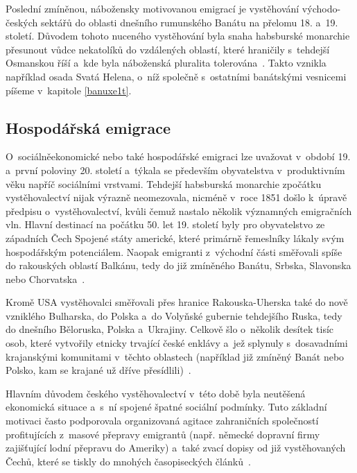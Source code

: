 Poslední zmíněnou, nábožensky motivovanou emigrací je vystěhování východo-českých sektářů do oblasti dnešního rumunského Banátu na přelomu 18. a~19. století. Důvodem tohoto nuceného vystěhování byla snaha habsburské monarchie přesunout vůdce nekatolíků do vzdálených oblastí, které hraničily s~tehdejší Osmanskou říší a~kde byla náboženská pluralita tolerována~\parencite{Nespor2005}. Takto vznikla například osada Svatá Helena, o~níž společně s~ostatními banátskými vesnicemi píšeme v~kapitole \ref{banuxe1t}.

\hypertarget{hospoduxe1ux159skuxe1-emigrace}{%
\subsection{Hospodářská emigrace}\label{hospoduxe1ux159skuxe1-emigrace}}

O~sociálněekonomické nebo také hospodářské emigraci lze uvažovat v~období 19. a~první poloviny 20. století a~týkala se především obyvatelstva v~produktivním věku napříč sociálními vrstvami. Tehdejší habsburská monarchie zpočátku vystěhovalectví nijak výrazně neomezovala, nicméně v~roce 1851 došlo k~úpravě předpisu o~vystěhovalectví, kvůli čemuž nastalo několik významných emigračních vln. Hlavní destinací na počátku 50. let 19. století byly pro obyvatelstvo ze západních Čech Spojené státy americké, které primárně řemeslníky lákaly svým hospodářským potenciálem. Naopak emigranti z~východní části směřovali spíše do rakouských oblastí Balkánu, tedy do již zmíněného Banátu, Srbska, Slavonska nebo Chorvatska~\parencite{Vaculik2009b}.

Kromě USA vystěhovalci směřovali přes hranice Rakouska-Uherska také do nově vzniklého Bulharska, do Polska a~do Volyňské gubernie tehdejšího Ruska, tedy do dnešního Běloruska, Polska a~Ukrajiny. Celkově šlo o~několik desítek tisíc osob, které vytvořily etnicky trvající české enklávy a~jež splynuly s~dosavadními krajanskými komunitami v~těchto oblastech (například již zmíněný Banát nebo Polsko, kam se krajané už dříve přesídlili)~\parencite{Nespor2005}.

Hlavním důvodem českého vystěhovalectví v~této době byla neutěšená ekonomická situace a~s~ní spojené špatné sociální podmínky. Tuto základní motivaci často podporovala organizovaná agitace zahraničních společností profitujících z~masové přepravy emigrantů (např. německé dopravní firmy zajišťující lodní přepravu do Ameriky) a~také zvací dopisy od již vystěhovaných Čechů, které se tiskly do mnohých časopiseckých článků~\parencite{Vaculik2009a}.

